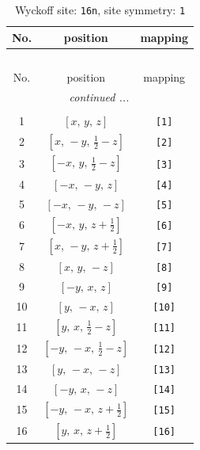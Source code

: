 \documentclass[fleqn,8pt]{jsarticle}
\begin{document}
\begin{longtable}{ccc}
\caption{Wyckoff site: {\tt 16n}, site symmetry: {\tt 1}}
 \\
 \hline \hline
No. & position & mapping \\ \hline \endfirsthead

\multicolumn{2}{l}{\tablename\ \thetable{}} \\
 \hline \hline
No. & position & mapping \\ \hline \endhead

 \hline \hline
\multicolumn{2}{r}{\footnotesize\it continued ...} \\ \endfoot

 \hline \hline
\multicolumn{2}{r}{} \\ \endlastfoot

1 & $\left[ x,\, y,\, z \right]$ & {\tt [1]} \\ \hline
2 & $\left[ x,\, - y,\, \frac{1}{2} - z \right]$ & {\tt [2]} \\ \hline
3 & $\left[ - x,\, y,\, \frac{1}{2} - z \right]$ & {\tt [3]} \\ \hline
4 & $\left[ - x,\, - y,\, z \right]$ & {\tt [4]} \\ \hline
5 & $\left[ - x,\, - y,\, - z \right]$ & {\tt [5]} \\ \hline
6 & $\left[ - x,\, y,\, z + \frac{1}{2} \right]$ & {\tt [6]} \\ \hline
7 & $\left[ x,\, - y,\, z + \frac{1}{2} \right]$ & {\tt [7]} \\ \hline
8 & $\left[ x,\, y,\, - z \right]$ & {\tt [8]} \\ \hline
9 & $\left[ - y,\, x,\, z \right]$ & {\tt [9]} \\ \hline
10 & $\left[ y,\, - x,\, z \right]$ & {\tt [10]} \\ \hline
11 & $\left[ y,\, x,\, \frac{1}{2} - z \right]$ & {\tt [11]} \\ \hline
12 & $\left[ - y,\, - x,\, \frac{1}{2} - z \right]$ & {\tt [12]} \\ \hline
13 & $\left[ y,\, - x,\, - z \right]$ & {\tt [13]} \\ \hline
14 & $\left[ - y,\, x,\, - z \right]$ & {\tt [14]} \\ \hline
15 & $\left[ - y,\, - x,\, z + \frac{1}{2} \right]$ & {\tt [15]} \\ \hline
16 & $\left[ y,\, x,\, z + \frac{1}{2} \right]$ & {\tt [16]} \\
\end{longtable}
\end{document}
